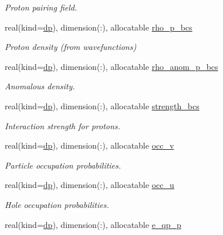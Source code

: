 \begin{DoxyCompactItemize}
\begin{DoxyCompactList}\small\item\em Proton pairing field. \end{DoxyCompactList}\item 
real(kind=\mbox{\hyperlink{namespaceparameters_a52f8c6351fd79345d8811e065bcbbb37}{dp}}), dimension(\+:), allocatable \mbox{\hyperlink{group__PAIRING_ga346a8d96825c42b0dcb9763ed8770a68}{rho\+\_\+p\+\_\+bcs}}
\begin{DoxyCompactList}\small\item\em Proton density (from wavefunctions) \end{DoxyCompactList}\item 
real(kind=\mbox{\hyperlink{namespaceparameters_a52f8c6351fd79345d8811e065bcbbb37}{dp}}), dimension(\+:), allocatable \mbox{\hyperlink{group__PAIRING_ga5ad9bf187e94e8effb3d4bbcc2f2495f}{rho\+\_\+anom\+\_\+p\+\_\+bcs}}
\begin{DoxyCompactList}\small\item\em Anomalous density. \end{DoxyCompactList}\item 
real(kind=\mbox{\hyperlink{namespaceparameters_a52f8c6351fd79345d8811e065bcbbb37}{dp}}), dimension(\+:), allocatable \mbox{\hyperlink{group__PAIRING_ga94c22855af03bc8be5e687f4c8a80ee1}{strength\+\_\+bcs}}
\begin{DoxyCompactList}\small\item\em Interaction strength for protons. \end{DoxyCompactList}\item 
real(kind=\mbox{\hyperlink{namespaceparameters_a52f8c6351fd79345d8811e065bcbbb37}{dp}}), dimension(\+:), allocatable \mbox{\hyperlink{group__PAIRING_ga653f936e90e0606e8b49069e9d2c03d4}{occ\+\_\+v}}
\begin{DoxyCompactList}\small\item\em Particle occupation probabilities. \end{DoxyCompactList}\item 
real(kind=\mbox{\hyperlink{namespaceparameters_a52f8c6351fd79345d8811e065bcbbb37}{dp}}), dimension(\+:), allocatable \mbox{\hyperlink{group__PAIRING_ga705a97e5d2ac10a6facfe20757a6bbd4}{occ\+\_\+u}}
\begin{DoxyCompactList}\small\item\em Hole occupation probabilities. \end{DoxyCompactList}\item 
real(kind=\mbox{\hyperlink{namespaceparameters_a52f8c6351fd79345d8811e065bcbbb37}{dp}}), dimension(\+:), allocatable \mbox{\hyperlink{group__PAIRING_ga19d67e5b89ebd51642f7ef33a88d5cb2}{e\+\_\+qp\+\_\+p}}

\end{DoxyCompactItemize}
